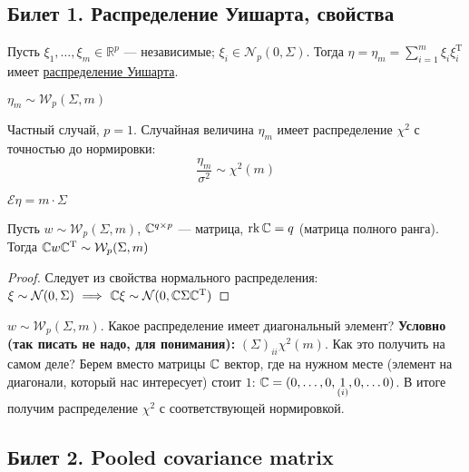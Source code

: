 \subsection{Билет 1. Распределение Уишарта, свойства}
\begin{dfn}
Пусть $\xi_1, \dots, \xi_m \in \mathbb{R}^p$ --- независимые; $\xi_i \in \mathcal{N}_{p} (0,\Sigma)$.
Тогда $\eta = \eta_m = \sum \limits_{i = 1}^{m} \xi_i \xi_i^{\mathrm{T}}$ имеет \underline{распределение Уишарта}. 
\end{dfn}
\begin{design}
$\eta_m \sim \mathcal{W}_p (\Sigma, m)$
\end{design}
\begin{prop}[1]
Частный случай, $p = 1$.
Случайная величина $\eta_m$ имеет распределение $\chi^2$ с точностью до нормировки:
\begin{equation*}
\frac{\eta_m}{\sigma^2} \sim \chi^2(m)
\end{equation*}
\end{prop}
\begin{prop}[2]
$\mathcal{E}\eta = m \cdot \Sigma$
\end{prop}
\begin{prop}[3]
\begin{sug}
Пусть $w \sim \mathcal{W}_p (\Sigma, m)$, $\mathbb{C}^{q \times p}$ --- матрица, $\operatorname{rk} \mathbb{C} = q$ (матрица полного ранга). Тогда $\mathbb{C} w \mathbb{C}^{\mathrm{T}} \sim \mathcal{W}_p (\Sigma, m)$
\end{sug}
\begin{proof}
Следует из свойства нормального распределения: $\xi \sim \mathcal{N}(0,\Sigma) \ \Longrightarrow \  \mathbb{C} \xi \sim \mathcal{N}(0,\mathbb{C} \Sigma \mathbb{C}^{\mathrm{T}})$
\end{proof}
\begin{con}
$w \sim \mathcal{W}_p (\Sigma, m)$. Какое распределение имеет диагональный элемент?
\textbf{Условно (так писать не надо, для понимания):} $(\Sigma)_{ii} \chi^2 (m)$.
Как это получить на самом деле?
Берем вместо матрицы $\mathbb{C}$ вектор, где на нужном месте (элемент на диагонали, который нас интересует) стоит $1$: $\mathbb{C} = (0, \dots, 0, \underset{(i)}{1}, 0, \dots 0)$. В итоге получим распределение $\chi^2$ с соответствующей нормировкой.
\end{con}
\end{prop}
\subsection{Билет 2. Pooled covariance matrix}

